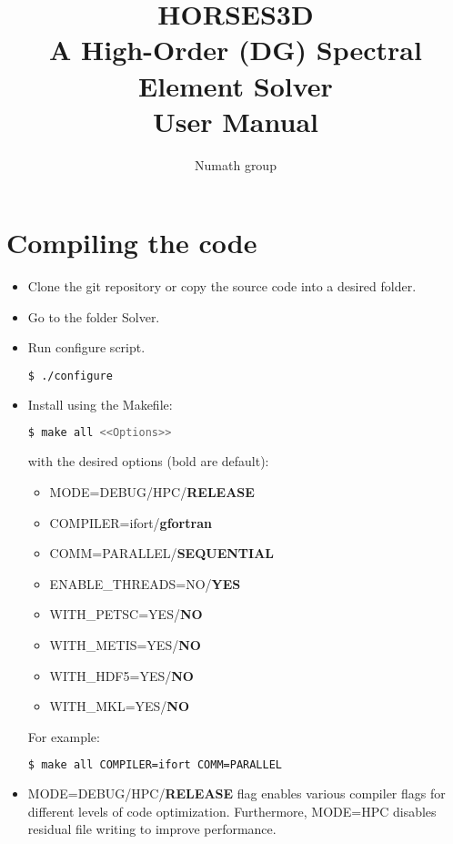 \documentclass[a4paper,10pt]{report}
\title{\textbf{HORSES3D} \\ A \textbf{H}igh-\textbf{Or}der (DG) \textbf{S}pectral \textbf{E}lement \textbf{S}olver \\ \textbf{User Manual}}
\author{Numath group}
\begin{document}
\lstset{language=C++}

\maketitle

\tableofcontents

\chapter{Compiling the code} \label{sect:compiling}

\begin{itemize}
\item Clone the git repository or copy the source code into a desired folder.

\item Go to the folder Solver.

\item Run configure script.
\begin{lstlisting}[language=bash]
	$ ./configure
\end{lstlisting}
\item Install using the Makefile:
\begin{lstlisting}[language=bash]
	$ make all <<Options>>
\end{lstlisting}
with the desired options (bold are default):

\begin{itemize}
\item MODE=DEBUG/HPC/\textbf{RELEASE}
\item COMPILER=ifort/\textbf{gfortran}
\item COMM=PARALLEL/\textbf{SEQUENTIAL}
\item ENABLE\_THREADS=NO/\textbf{YES}
\item WITH\_PETSC=YES/\textbf{NO}
\item WITH\_METIS=YES/\textbf{NO}
\item WITH\_HDF5=YES/\textbf{NO}
\item WITH\_MKL=YES/\textbf{NO}
\end{itemize}

For example:
\begin{lstlisting}[language=bash]
	$ make all COMPILER=ifort COMM=PARALLEL
\end{lstlisting}

\item MODE=DEBUG/HPC/\textbf{RELEASE} flag enables various compiler flags for different levels of code optimization. Furthermore, MODE=HPC disables residual file writing to improve performance. 


\end{itemize}
\end{document}
